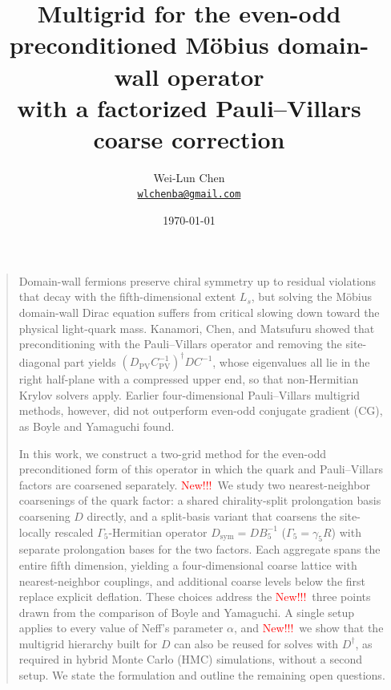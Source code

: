 \documentclass[11pt,a4paper]{article}
\title{Multigrid for the even-odd preconditioned M\"obius domain-wall operator\\
with a factorized Pauli--Villars coarse correction}
\author{Wei-Lun Chen\\[0.3ex]{\small\href{mailto:wlchenba@gmail.com}{\texttt{wlchenba@gmail.com}}}}
\date{\today}
\makeatletter
\newif\ifshownew \shownewtrue
\DeclareRobustCommand\New{\ifshownew\textcolor{red}{New!!!}\ \else\ignorespaces\fi}
\renewenvironment{abstract}{%
  \begin{quote}\small\noindent}{\end{quote}\vspace{0.6ex}}
\renewcommand\maketitle{\begin{center}%
  {\large\bfseries\@title\par}\vspace{1.4ex}%
  {\normalsize\@author\par}\vspace{0.4ex}%
  {\small\itshape\@date\par}\end{center}\vspace{0.6ex}}
\numberwithin{equation}{section}
\newcommand{\dg}{^{\dagger}}
\newcommand{\Dpv}{D_{\mathrm{PV}}}
\newcommand{\Cpv}{C_{\mathrm{PV}}}
\newcommand{\Gfive}{\Gamma_5}
\newcommand{\Dsym}{D_{\mathrm{sym}}}
\newif\ifresults
\makeatother
\begin{document}
\maketitle

\begin{abstract}
Domain-wall fermions preserve chiral symmetry up to residual violations that decay with the
fifth-dimensional extent $L_s$, but solving the M\"obius domain-wall Dirac equation suffers from
critical slowing down toward the physical light-quark mass. Kanamori, Chen, and Matsufuru showed
that preconditioning with the Pauli--Villars operator and removing the site-diagonal part yields
$(\Dpv\Cpv^{-1})\dg DC^{-1}$, whose eigenvalues all lie in the right half-plane with a compressed
upper end, so that non-Hermitian Krylov solvers apply. Earlier four-dimensional Pauli--Villars
multigrid methods, however, did not outperform even-odd conjugate gradient (CG), as Boyle and
Yamaguchi found.

In this work, we construct a two-grid method for the even-odd preconditioned form of this operator
in which the quark and Pauli--Villars factors are coarsened separately. \New We study two
nearest-neighbor coarsenings of the quark factor: a shared chirality-split prolongation basis
coarsening $D$ directly, and a split-basis variant that coarsens the site-locally rescaled
$\Gfive$-Hermitian operator $\Dsym=DB_5^{-1}$ ($\Gfive=\gamma_5 R$) with separate prolongation
bases for the two factors. Each aggregate spans the entire fifth dimension, yielding a
four-dimensional coarse lattice with nearest-neighbor couplings, and additional coarse levels below
the first replace explicit deflation. These choices address the \New three points drawn from the
comparison of Boyle and Yamaguchi. A single setup applies to every value of Neff's parameter
$\alpha$, and \New we show that the multigrid hierarchy built for $D$ can also be reused for solves
with $D\dg$, as required in hybrid Monte Carlo (HMC) simulations, without a second setup.
\ifresults{} Across four quenched $24^3\times48$ configurations at $L_s=8$, the iteration count
increases by a factor of $2.0$--$2.4$ between $m=0.1$ and $m=0.001$, compared with $20$--$32$ for
mixed-precision even-odd CGNE \New without deflation. At $m=0.001$, a single solve is
$6.4$--$10.9$ times faster than mixed-precision CGNE, and a complete 12-column point-source
propagator takes \New $0.27$--$0.49$ of its wall-clock time including setup. At $L_s=16$ on
$24^4$ with three bootstrap rounds, neither nine-point variant covers both link setups. The shared
basis converges with stout links at $M_5=1.0$ ($18$--$29$ iterations) where the split basis stalls,
whereas with bare links at $M_5=1.8$ the split basis converges ($23$--$29$ iterations) while the
shared basis stalls on two of three tested configurations.\else{} We state the formulation and outline the remaining open
questions.\fi{}
\end{abstract}
{\let\thefootnote\relax{}}
\end{document}
